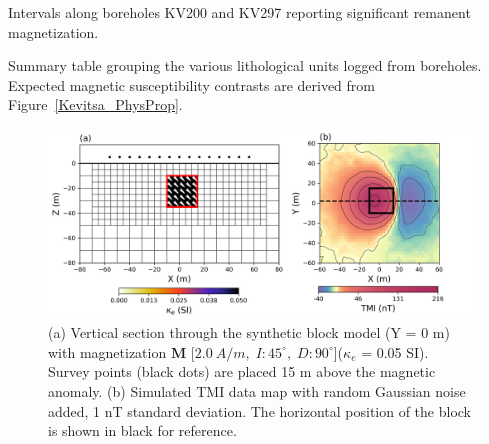 \documentclass[paper]{geophysics}
\begin{document}
\pagebreak

\begin{table}
\caption{Intervals along boreholes KV200 and KV297 reporting significant remanent magnetization.}
\label{Table1}
\end{table}

\begin{table}
\caption{Summary table grouping the various lithological units logged from boreholes. Expected magnetic susceptibility contrasts are derived from Figure~\ref{Kevitsa_PhysProp}.}
\label{Table2}
\end{table}

\pagebreak

\begin{figure}[p!]
\includegraphics[width=\columnwidth]{Figures/Figure1.png}
\caption{(a) Vertical section through the synthetic block model (Y = 0 m) with magnetization $\mathbf{M}$ [$2.0\: A/m,\; I: 45^\circ,\; D: 90^\circ$]($\kappa_e$ = 0.05 SI). Survey points (black dots) are placed 15 m above the magnetic anomaly. (b) Simulated TMI data map with random Gaussian noise added, 1 nT standard deviation. The horizontal position of the block is shown in black for reference.}
\label{REM_model}
\end{figure}
\end{document}
